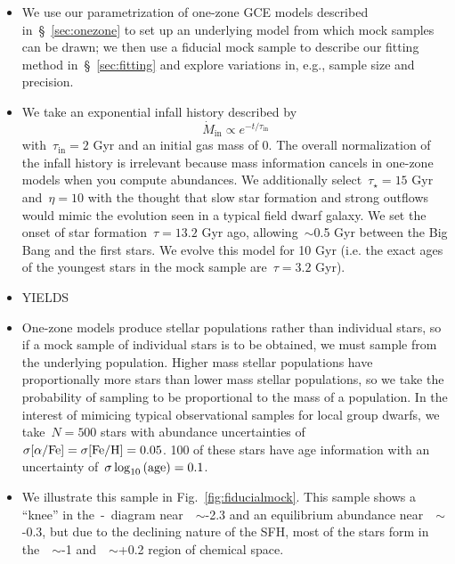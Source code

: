 \documentclass[ms.tex]{subfiles}
\begin{document}
\begin{itemize}

	\item We use our parametrization of one-zone GCE models described
	in~\S~\ref{sec:onezone} to set up an underlying model from which
	mock samples can be drawn; we then use a fiducial mock sample to describe
	our fitting method in~\S~\ref{sec:fitting} and explore variations
	in, e.g., sample size and precision.

	\item We take an exponential infall history described by
	\begin{equation}
	\dot{M}_\text{in} \propto e^{-t/\tau_\text{in}}
	\end{equation}
	with~$\tau_\text{in} = 2$ Gyr and an initial gas mass of 0.
	The overall normalization of the infall history is irrelevant because
	mass information cancels in one-zone models when you compute abundances.
	We additionally select~$\tau_\star = 15$ Gyr and~$\eta = 10$ with the
	thought that slow star formation and strong outflows would mimic the
	evolution seen in a typical field dwarf galaxy.
	We set the onset of star formation~$\tau = 13.2$ Gyr ago, allowing~$\sim$0.5
	Gyr between the Big Bang and the first stars.
	We evolve this model for 10 Gyr (i.e. the exact ages of the youngest stars
	in the mock sample are~$\tau = 3.2$ Gyr).

	\item {\color{red} YIELDS}

	\item One-zone models produce stellar populations rather than individual
	stars, so if a mock sample of individual stars is to be obtained, we must
	sample from the underlying population.
	Higher mass stellar populations have proportionally more stars than lower
	mass stellar populations, so we take the probability of sampling to be
	proportional to the mass of a population.
	In the interest of mimicing typical observational samples for local group
	dwarfs, we take~$N = 500$ stars with abundance uncertainties of
	$\sigma\text{[$\alpha$/Fe]} = \sigma\text{[Fe/H]} = 0.05$.
	100 of these stars have age information with an uncertainty
	of~$\sigma\log_{10}\text{(age)} = 0.1$.

	\item We illustrate this sample in Fig.~\ref{fig:fiducialmock}.
	This sample shows a ``knee'' in the~\afe-\feh~diagram near~\feh~$\sim$-2.3
	and an equilibrium abundance near~\feh~$\sim$-0.3, but due to the
	declining nature of the SFH, most of the stars form in
	the~\feh~$\sim$-1 and~\afe~$\sim$+0.2 region of chemical space.

\end{itemize}
\end{document}

